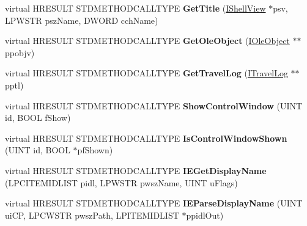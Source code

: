 \begin{DoxyCompactItemize}
\item 
\mbox{\label{class_c_common_browser_aefe10fe20291d8b7b2d7791cfaf1706e}} 
virtual H\+R\+E\+S\+U\+LT S\+T\+D\+M\+E\+T\+H\+O\+D\+C\+A\+L\+L\+T\+Y\+PE {\bfseries Get\+Title} (\hyperlink{interface_i_shell_view}{I\+Shell\+View} $\ast$psv, L\+P\+W\+S\+TR psz\+Name, D\+W\+O\+RD cch\+Name)
\item 
\mbox{\label{class_c_common_browser_ac6a35b67dc9253341da29e40ed126b32}} 
virtual H\+R\+E\+S\+U\+LT S\+T\+D\+M\+E\+T\+H\+O\+D\+C\+A\+L\+L\+T\+Y\+PE {\bfseries Get\+Ole\+Object} (\hyperlink{interface_i_ole_object}{I\+Ole\+Object} $\ast$$\ast$ppobjv)
\item 
\mbox{\label{class_c_common_browser_a2a6f17e9209653e7815de34ecad0fea8}} 
virtual H\+R\+E\+S\+U\+LT S\+T\+D\+M\+E\+T\+H\+O\+D\+C\+A\+L\+L\+T\+Y\+PE {\bfseries Get\+Travel\+Log} (\hyperlink{interface_i_travel_log}{I\+Travel\+Log} $\ast$$\ast$pptl)
\item 
\mbox{\label{class_c_common_browser_ac7dc9524a5d55ce96b19ee2bb0bab85b}} 
virtual H\+R\+E\+S\+U\+LT S\+T\+D\+M\+E\+T\+H\+O\+D\+C\+A\+L\+L\+T\+Y\+PE {\bfseries Show\+Control\+Window} (U\+I\+NT id, B\+O\+OL f\+Show)
\item 
\mbox{\label{class_c_common_browser_a2e6db9735b0c66f0473e3b527396c22f}} 
virtual H\+R\+E\+S\+U\+LT S\+T\+D\+M\+E\+T\+H\+O\+D\+C\+A\+L\+L\+T\+Y\+PE {\bfseries Is\+Control\+Window\+Shown} (U\+I\+NT id, B\+O\+OL $\ast$pf\+Shown)
\item 
\mbox{\label{class_c_common_browser_a8839f9ed57358ae530a8760c8a023311}} 
virtual H\+R\+E\+S\+U\+LT S\+T\+D\+M\+E\+T\+H\+O\+D\+C\+A\+L\+L\+T\+Y\+PE {\bfseries I\+E\+Get\+Display\+Name} (L\+P\+C\+I\+T\+E\+M\+I\+D\+L\+I\+ST pidl, L\+P\+W\+S\+TR pwsz\+Name, U\+I\+NT u\+Flags)
\item 
\mbox{\label{class_c_common_browser_aac76e65111a9cf00bb70899795a40651}} 
virtual H\+R\+E\+S\+U\+LT S\+T\+D\+M\+E\+T\+H\+O\+D\+C\+A\+L\+L\+T\+Y\+PE {\bfseries I\+E\+Parse\+Display\+Name} (U\+I\+NT ui\+CP, L\+P\+C\+W\+S\+TR pwsz\+Path, L\+P\+I\+T\+E\+M\+I\+D\+L\+I\+ST $\ast$ppidl\+Out)
\item 

\end{DoxyCompactItemize}

